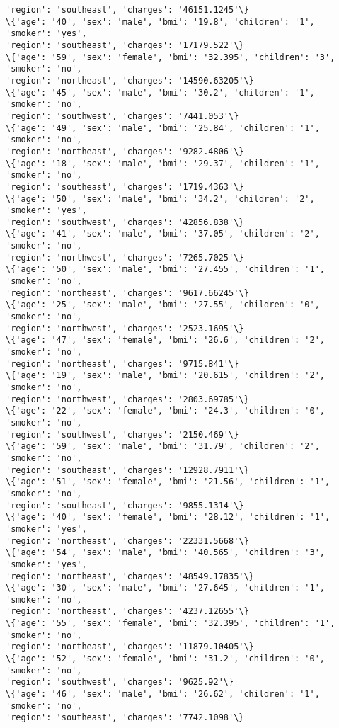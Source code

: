 \documentclass[11pt]{article}
\begin{document}
\begin{Verbatim}[commandchars=\\\{\}]
'region': 'southeast', 'charges': '46151.1245'\}
\{'age': '40', 'sex': 'male', 'bmi': '19.8', 'children': '1', 'smoker': 'yes',
'region': 'southeast', 'charges': '17179.522'\}
\{'age': '59', 'sex': 'female', 'bmi': '32.395', 'children': '3', 'smoker': 'no',
'region': 'northeast', 'charges': '14590.63205'\}
\{'age': '45', 'sex': 'male', 'bmi': '30.2', 'children': '1', 'smoker': 'no',
'region': 'southwest', 'charges': '7441.053'\}
\{'age': '49', 'sex': 'male', 'bmi': '25.84', 'children': '1', 'smoker': 'no',
'region': 'northeast', 'charges': '9282.4806'\}
\{'age': '18', 'sex': 'male', 'bmi': '29.37', 'children': '1', 'smoker': 'no',
'region': 'southeast', 'charges': '1719.4363'\}
\{'age': '50', 'sex': 'male', 'bmi': '34.2', 'children': '2', 'smoker': 'yes',
'region': 'southwest', 'charges': '42856.838'\}
\{'age': '41', 'sex': 'male', 'bmi': '37.05', 'children': '2', 'smoker': 'no',
'region': 'northwest', 'charges': '7265.7025'\}
\{'age': '50', 'sex': 'male', 'bmi': '27.455', 'children': '1', 'smoker': 'no',
'region': 'northeast', 'charges': '9617.66245'\}
\{'age': '25', 'sex': 'male', 'bmi': '27.55', 'children': '0', 'smoker': 'no',
'region': 'northwest', 'charges': '2523.1695'\}
\{'age': '47', 'sex': 'female', 'bmi': '26.6', 'children': '2', 'smoker': 'no',
'region': 'northeast', 'charges': '9715.841'\}
\{'age': '19', 'sex': 'male', 'bmi': '20.615', 'children': '2', 'smoker': 'no',
'region': 'northwest', 'charges': '2803.69785'\}
\{'age': '22', 'sex': 'female', 'bmi': '24.3', 'children': '0', 'smoker': 'no',
'region': 'southwest', 'charges': '2150.469'\}
\{'age': '59', 'sex': 'male', 'bmi': '31.79', 'children': '2', 'smoker': 'no',
'region': 'southeast', 'charges': '12928.7911'\}
\{'age': '51', 'sex': 'female', 'bmi': '21.56', 'children': '1', 'smoker': 'no',
'region': 'southeast', 'charges': '9855.1314'\}
\{'age': '40', 'sex': 'female', 'bmi': '28.12', 'children': '1', 'smoker': 'yes',
'region': 'northeast', 'charges': '22331.5668'\}
\{'age': '54', 'sex': 'male', 'bmi': '40.565', 'children': '3', 'smoker': 'yes',
'region': 'northeast', 'charges': '48549.17835'\}
\{'age': '30', 'sex': 'male', 'bmi': '27.645', 'children': '1', 'smoker': 'no',
'region': 'northeast', 'charges': '4237.12655'\}
\{'age': '55', 'sex': 'female', 'bmi': '32.395', 'children': '1', 'smoker': 'no',
'region': 'northeast', 'charges': '11879.10405'\}
\{'age': '52', 'sex': 'female', 'bmi': '31.2', 'children': '0', 'smoker': 'no',
'region': 'southwest', 'charges': '9625.92'\}
\{'age': '46', 'sex': 'male', 'bmi': '26.62', 'children': '1', 'smoker': 'no',
'region': 'southeast', 'charges': '7742.1098'\}

\end{Verbatim}
\end{document}
